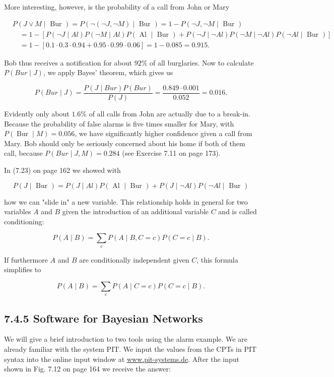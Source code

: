 \documentclass[10pt]{book}
\begin{document}
\begin{center}
\begin{enumerate}
More interesting, however, is the probability of a call from John or Mary

$$
\begin{aligned}
& P(J \vee M \mid \text { Bur })=P(\neg(\neg J, \neg M) \mid \text { Bur })=1-P(\neg J, \neg M \mid \text { Bur }) \\
& \quad=1-[P(\neg J \mid A l) P(\neg M \mid A l) P(\text { Al } \mid \text { Bur })+P(\neg J \mid \neg A l) P(\neg M \mid \neg A l) P(\neg A l \mid \text { Bur })] \\
& \quad=1-[0.1 \cdot 0.3 \cdot 0.94+0.95 \cdot 0.99 \cdot 0.06]=1-0.085=0.915 .
\end{aligned}
$$

Bob thus receives a notification for about $92 \%$ of all burglaries. Now to calculate $P(B u r \mid J)$, we apply Bayes' theorem, which gives us

$$
P(B u r \mid J)=\frac{P(J \mid B u r) P(B u r)}{P(J)}=\frac{0.849 \cdot 0.001}{0.052}=0.016 .
$$

Evidently only about $1.6 \%$ of all calls from John are actually due to a break-in. Because the probability of false alarms is five times smaller for Mary, with $P(\operatorname{Bur} \mid M)=0.056$, we have significantly higher confidence given a call from Mary. Bob should only be seriously concerned about his home if both of them call, because $P(B u r \mid J, M)=0.284$ (see Exercise 7.11 on page 173).

In (7.23) on page 162 we showed with

$$
P(J \mid \text { Bur })=P(J \mid A l) P(\text { Al } \mid \text { Bur })+P(J \mid \neg A l) P(\neg A l \mid \text { Bur })
$$

how we can "slide in" a new variable. This relationship holds in general for two variables $A$ and $B$ given the introduction of an additional variable $C$ and is called conditioning:

$$
P(A \mid B)=\sum_{c} P(A \mid B, C=c) P(C=c \mid B) .
$$

If furthermore $A$ and $B$ are conditionally independent given $C$, this formula simplifies to

$$
P(A \mid B)=\sum_{c} P(A \mid C=c) P(C=c \mid B) .
$$

\subsection*{7.4.5 Software for Bayesian Networks}
We will give a brief introduction to two tools using the alarm example. We are already familiar with the system PIT. We input the values from the CPTs in PIT syntax into the online input window at \href{http://www.pit-systems.de}{www.pit-systems.de}. After the input shown in Fig. 7.12 on page 164 we receive the answer:


\end{enumerate}
\end{center}
\end{document}
